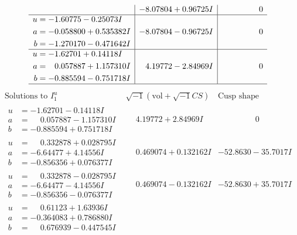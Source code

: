 \documentclass[1p]{elsarticle_modified}
\theoremstyle{definition}
\newcommand{\I}{\sqrt{-1}}
\begin{document}
$$\begin{array}{c|c|c}
 & -8.07804 + 0.96725 I & \phantom{-0.000000 } 0 \\ \hline\begin{aligned}
u &= -1.60775 - 0.25073 I \\
a &= -0.058800 + 0.535382 I \\
b &= -1.270170 - 0.471642 I\end{aligned}
 & -8.07804 - 0.96725 I & \phantom{-0.000000 } 0 \\ \hline\begin{aligned}
u &= -1.62701 + 0.14118 I \\
a &= \phantom{-}0.057887 + 1.157310 I \\
b &= -0.885594 - 0.751718 I\end{aligned}
 & \phantom{-}4.19772 - 2.84969 I & \phantom{-0.000000 } 0\\
 \hline 
 \end{array}$$\newpage$$\begin{array}{c|c|c}  
\text{Solutions to }I^u_{1}& \I (\text{vol} + \sqrt{-1}CS) & \text{Cusp shape}\\
 \hline 
\begin{aligned}
u &= -1.62701 - 0.14118 I \\
a &= \phantom{-}0.057887 - 1.157310 I \\
b &= -0.885594 + 0.751718 I\end{aligned}
 & \phantom{-}4.19772 + 2.84969 I & \phantom{-0.000000 } 0 \\ \hline\begin{aligned}
u &= \phantom{-}0.332878 + 0.028795 I \\
a &= -6.64477 + 4.14556 I \\
b &= -0.856356 + 0.076377 I\end{aligned}
 & \phantom{-}0.469074 + 0.132162 I & -52.8630 - 35.7017 I \\ \hline\begin{aligned}
u &= \phantom{-}0.332878 - 0.028795 I \\
a &= -6.64477 - 4.14556 I \\
b &= -0.856356 - 0.076377 I\end{aligned}
 & \phantom{-}0.469074 - 0.132162 I & -52.8630 + 35.7017 I \\ \hline\begin{aligned}
u &= \phantom{-}0.61123 + 1.63936 I \\
a &= -0.364083 + 0.786880 I \\
b &= \phantom{-}0.676939 - 0.447545 I\end{aligned}

\end{array}$$
\end{document}
